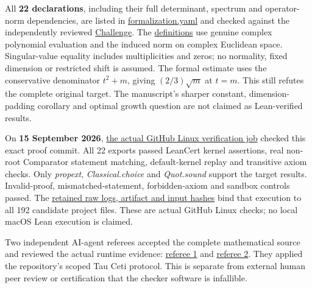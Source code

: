 \documentclass[11pt,a4paper]{article}
\begin{document}
All \textbf{22 declarations}, including their full determinant, spectrum
and operator-norm dependencies, are listed in
\href{https://github.com/ajt60gaibb/OpenProblemsInNLA/blob/main/matrix-functions-and-stability/MF-24/lean/formalization.yaml}{formalization.yaml}
and checked against the independently reviewed
\href{https://github.com/ajt60gaibb/OpenProblemsInNLA/blob/main/matrix-functions-and-stability/MF-24/lean/Challenge.lean}{Challenge}.
The
\href{https://github.com/ajt60gaibb/OpenProblemsInNLA/blob/main/matrix-functions-and-stability/MF-24/lean/NLA/MF24/Definitions.lean}{definitions}
use genuine complex polynomial evaluation and the induced norm on
complex Euclidean space. Singular-value equality includes multiplicities
and zeros; no normality, fixed dimension or restricted shift is assumed.
The formal estimate uses the conservative denominator \(t^2+m\), giving
\((2/3)\sqrt m\) at \(t=m\). This still refutes the complete original
target. The manuscript's sharper constant, dimension-padding corollary
and optimal growth question are not claimed as Lean-verified results.

On \textbf{15 September 2026},
\href{https://github.com/sgstepaniants/OpenProblemsInNLA/actions/runs/35033148310/job/104596164346}{the
actual GitHub Linux verification job} checked this exact proof commit.
All 22 exports passed LeanCert kernel assertions, real non-root
Comparator statement matching, default-kernel replay and transitive
axiom checks. Only \textit{propext}, \textit{Classical.choice} and
\textit{Quot.sound} support the target results. Invalid-proof,
mismatched-statement, forbidden-axiom and sandbox controls passed. The
\href{https://github.com/ajt60gaibb/OpenProblemsInNLA/blob/main/matrix-functions-and-stability/MF-24/lean/verification/linux-2026-09-15}{retained
raw logs, artifact and input hashes} bind that execution to all 192
candidate project files. These are actual GitHub Linux checks; no local
macOS Lean execution is claimed.

Two independent AI-agent referees accepted the complete mathematical
source and reviewed the actual runtime evidence:
\href{https://github.com/ajt60gaibb/OpenProblemsInNLA/blob/main/matrix-functions-and-stability/MF-24/lean/reviews/final/referee-root/REVIEW.md}{referee
1} and
\href{https://github.com/ajt60gaibb/OpenProblemsInNLA/blob/main/matrix-functions-and-stability/MF-24/lean/reviews/final/referee-inequalities/REVIEW.md}{referee
2}. They applied the repository's scoped Tau Ceti protocol. This is
separate from external human peer review or certification that the
checker software is infallible.
\end{document}
